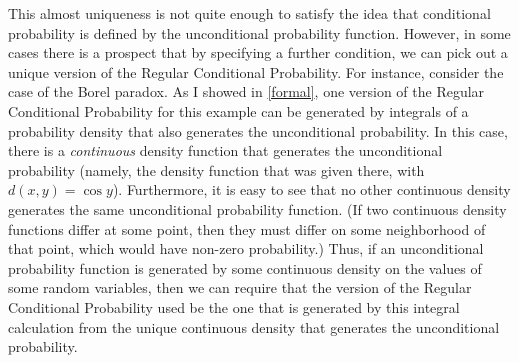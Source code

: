 This almost uniqueness is not quite enough to satisfy the idea that conditional probability is defined by the unconditional probability function. However, in some cases there is a prospect that by specifying a further condition, we can pick out a unique version of the Regular Conditional Probability. For instance, consider the case of the Borel paradox. As I showed in \autoref{formal}, one version of the Regular Conditional Probability for this example can be generated by integrals of a probability density that also generates the unconditional probability. In this case, there is a \emph{continuous} density function that generates the unconditional probability (namely, the density function that was given there, with $d(x,y)=\cos y$). Furthermore, it is easy to see that no other continuous density generates the same unconditional probability function. (If two continuous density functions differ at some point, then they must differ on some neighborhood of that point, which would have non-zero probability.) Thus, if an unconditional probability function is generated by some continuous density on the values of some random variables, then we can require that the version of the Regular Conditional Probability used be the one that is generated by this integral calculation from the unique continuous density that generates the unconditional probability.%
